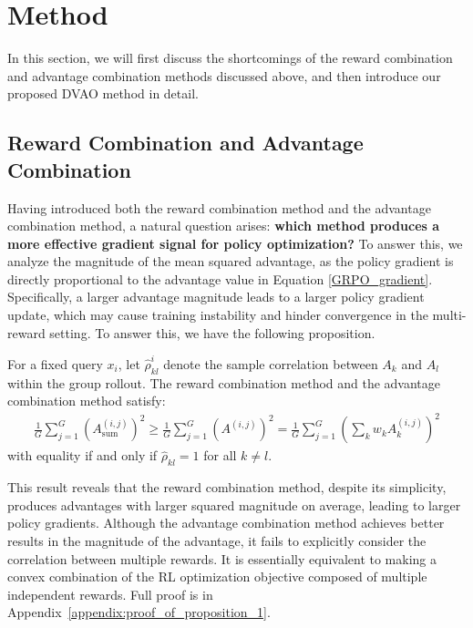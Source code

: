 \section{Method}
In this section, we will first discuss the shortcomings of the reward combination and advantage combination methods discussed above, and then introduce our proposed DVAO method in detail.

\subsection{Reward Combination and Advantage Combination}
Having introduced both the reward combination method and the advantage combination method, a natural question arises: \textbf{which method produces a more effective gradient signal for policy optimization?} To answer this, we analyze the magnitude of the mean squared advantage, as the policy gradient is directly proportional to the advantage value in Equation \ref{GRPO_gradient}. Specifically, a larger advantage magnitude leads to a larger policy gradient update, which may cause training instability and hinder convergence in the multi-reward setting. To answer this, we have the following proposition.

\begin{proposition}
    For a fixed query $x_i$, let $\hat{\rho}_{kl}^i$ denote the sample correlation between $A_k$ and $A_l$ within the group rollout. The reward combination method and the advantage combination method satisfy:
    \begin{align}
        \frac{1}{G} \sum_{j=1}^G \left(A_\text{sum}^{(i,j)}\right)^2 \ge \frac{1}{G} \sum_{j=1}^G \left(A^{(i,j)}\right)^2 = \frac{1}{G} \sum_{j=1}^G \left(\sum_k w_k A_k^{(i,j)}\right)^2
    \end{align}
    with equality if and only if $\hat{\rho}_{kl}=1$ for all $k \neq l$.
\end{proposition}

This result reveals that the reward combination method, despite its simplicity, produces advantages with larger squared magnitude on average, leading to larger policy gradients. Although the advantage combination method achieves better results in the magnitude of the advantage, it fails to explicitly consider the correlation between multiple rewards. It is essentially equivalent to making a convex combination of the RL optimization objective composed of multiple independent rewards. Full proof is in Appendix~\ref{appendix:proof_of_proposition_1}.

